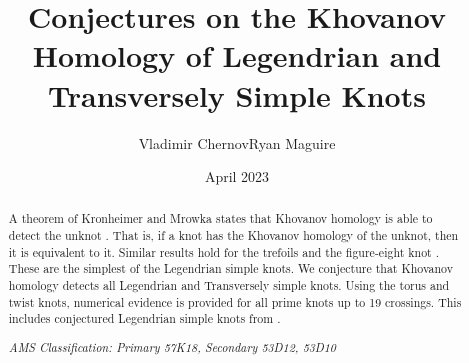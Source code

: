 \documentclass{article}
\title{Conjectures on the Khovanov Homology of Legendrian
       and Transversely Simple Knots}
\author{Vladimir Chernov\hspace{2em}Ryan Maguire}
\date{April 2023}
\theoremstyle{plain}
\begin{document}
    \maketitle
    \tableofcontents
    \begin{abstract}
        \noindent
        A theorem of Kronheimer and Mrowka states that Khovanov homology is
        able to detect the unknot \cite{KronheimerMrowka2011KhovanovUnknot}.
        That is, if a knot has the Khovanov homology of the unknot, then it is
        equivalent to it. Similar results hold for the trefoils
        \cite{BaldwinSivekKhovanovTrefoils} and the figure-eight knot
        \cite{BaldwinDowlinKhovanovFigureEight}. These are the
        simplest of the Legendrian simple knots. We conjecture that
        Khovanov homology detects all Legendrian and Transversely simple
        knots. Using the torus and twist knots, numerical evidence is provided
        for all prime knots up to 19 crossings.
        This includes conjectured Legendrian simple knots from
        \cite{LegendrianKnotAtlas}.
        \par\hfill\par
        \textit{AMS Classification: Primary 57K18, Secondary 53D12, 53D10}
    \end{abstract}
\end{document}
